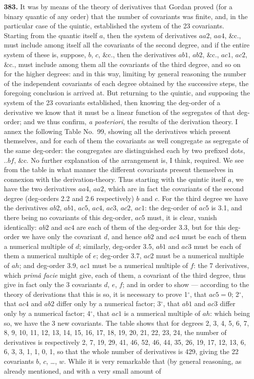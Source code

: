 \documentclass[12pt,a4paper]{article}
\begin{document}
\noindent\textbf{383.} It was by means of the theory of derivatives that Gordan proved (for a binary quantic of any order) that the number of covariants was finite, and, in the particular case of the quintic, established the system of the 23 covariants. Starting from the quantic itself $a$, then the system of derivatives $aa2$, $aa4$, \&c., must include among itself all the covariants of the second degree, and if the entire system of these is, suppose, $b$, $c$, \&c., then the derivatives $ab1$, $ab2$, \&c., $ac1$, $ac2$, \&c., must include among them all the covariants of the third degree, and so on for the higher degrees: and in this way, limiting by general reasoning the number of the independent covariants of each degree obtained by the successive steps, the foregoing conclusion is arrived at. But returning to the quintic, and supposing the system of the 23 covariants established, then knowing the deg-order of a derivative we know that it must be a linear function of the segregates of that deg-order; and we thus confirm, \textit{a posteriori}, the results of the derivation theory. I annex the following Table No.~99, showing all the derivatives which present themselves, and for each of them the covariants as well congregate as segregate of the same deg-order: the congregates are distinguished each by two prefixed dots, $..bf$, \&c. No further explanation of the arrangement is, I think, required. We see from the table in what manner the different covariants present themselves in connexion with the derivation-theory. Thus starting with the quintic itself $a$, we have the two derivatives $aa4$, $aa2$, which are in fact the covariants of the second degree (deg-orders 2.2 and 2.6 respectively) $b$ and $c$. For the third degree we have the derivatives $ab2$, $ab1$, $ac5$, $ac4$, $ac3$, $ac2$, $ac1$: the deg-order of $ac5$ is 3.1, and there being no covariants of this deg-order, $ac5$ must, it is clear, vanish identically: $ab2$ and $ac4$ are each of them of the deg-order 3.3, but for this deg-order we have only the covariant $d$, and hence $ab2$ and $ac4$ must be each of them a numerical multiple of $d$; similarly, deg-order 3.5, $ab1$ and $ac3$ must be each of them a numerical multiple of $e$; deg-order 3.7, $ac2$ must be a numerical multiple of $ah$; and deg-order 3.9, $ac1$ must be a numerical multiple of $f$: the 7 derivatives, which \textit{prim\^a facie} might give, each of them, a covariant of the third degree, thus give in fact only the 3 covariants $d$, $e$, $f$; and in order to show --- according to the theory of derivations that this is so, it is necessary to prove 1$^\circ$, that $ac5 = 0$; 2$^\circ$, that $ac4$ and $ab2$ differ only by a numerical factor; 3$^\circ$, that $ab1$ and $ac3$ differ only by a numerical factor; 4$^\circ$, that $ac1$ is a numerical multiple of $ah$: which being so, we have the 3 new covariants. The table shows that for degrees 2, 3, 4, 5, 6, 7, 8, 9, 10, 11, 12, 13, 14, 15, 16, 17, 18, 19, 20, 21, 22, 23, 24, the number of derivatives is respectively 2, 7, 19, 29, 41, 46, 52, 46, 44, 35, 26, 19, 17, 12, 13, 6, 6, 3, 3, 1, 1, 0, 1, so that the whole number of derivatives is 429, giving the 22 covariants $b$, $c$, \ldots, $w$. While it is very remarkable that (by general reasoning, as already mentioned, and with a very small amount of 
\end{document}
